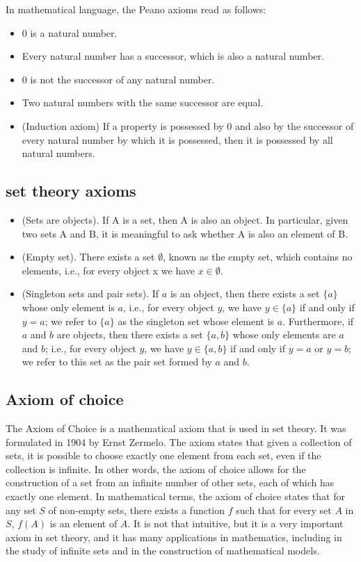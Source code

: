 \documentclass{article}
\begin{document}
In mathematical language, the Peano axioms read as follows:
\begin{itemize}
  \item 0 is a natural number.
  \item Every natural number has a successor, which is also a natural number.
  \item 0 is not the successor of any natural number.
  \item Two natural numbers with the same successor are equal.
  \item (Induction axiom) If a property is possessed by 0 and also by the successor of every natural number by which it is possessed, then it is possessed by all natural numbers.
\end{itemize}




\subsection{set theory axioms}
\begin{itemize}
	\item (Sets are objects). If A is a set, then A is also an object. In particular, given two sets A and B, it is meaningful to ask whether A is also an element of B.
	\item (Empty set). There exists a set $\emptyset$, known as the empty set, which contains no elements, i.e., for every object x we have $x\in \emptyset$.
	\item (Singleton sets and pair sets). If \( a \) is an object, then there exists a set \( \{a\} \) whose only element is \( a \), i.e., for every object \( y \), we have \( y \in \{a\} \) if and only if \( y = a \); we refer to \( \{a\} \) as the singleton set whose element is \( a \). Furthermore, if \( a \) and \( b \) are objects, then there exists a set \( \{a, b\} \) whose only elements are \( a \) and \( b \); i.e., for every object \( y \), we have \( y \in \{a, b\} \) if and only if \( y = a \) or \( y = b \); we refer to this set as the pair set formed by \( a \) and \( b \).
\end{itemize}


\subsection{Axiom of choice}
The Axiom of Choice is a mathematical axiom that is used in set theory.
It was formulated in 1904 by Ernst Zermelo. The axiom states that given a collection of sets, it is possible to choose exactly one element from each set, even if the collection is infinite. In other words, the axiom of choice allows for the construction of a set from an infinite number of other sets, each of which has exactly one element.
In mathematical terms, the axiom of choice states that for any set \( S \) of non-empty sets, there exists a function \( f \) such that for every set \( A \) in \( S \), \( f(A) \) is an element of \( A \).
It is not that intuitive, but it is a very important axiom in set theory, and it has many applications in mathematics, including in the study of infinite sets and in the construction of mathematical models.
\end{document}
